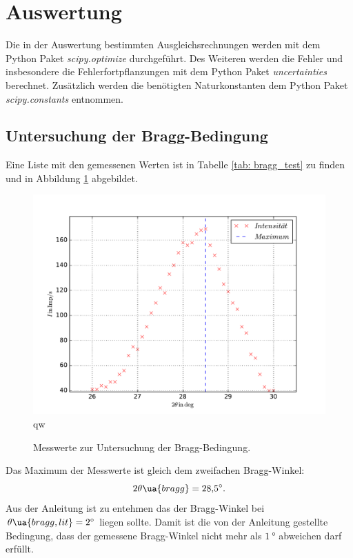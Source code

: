 \section{Auswertung}
Die in der Auswertung bestimmten Ausgleichsrechnungen werden mit
dem Python Paket \emph{scipy.optimize}\cite{scipy} durchgeführt.
Des Weiteren werden die Fehler und insbesondere die Fehlerfortpflanzungen
mit dem Python Paket \emph{uncertainties}\cite{uncertainties} berechnet.
Zusätzlich werden die benötigten Naturkonstanten dem Python Paket \emph{scipy.constants}\cite{scipy}
entnommen.
\FloatBarrier
\subsection{Untersuchung der Bragg-Bedingung}
Eine Liste mit den gemessenen Werten ist in Tabelle \ref{tab: bragg_test} zu finden und in Abbildung \ref{fig: bragg_plot} abgebildet.

\begin{figure}
  \centering
  \includegraphics[width=0.8 \textwidth]{../Messdaten/bragbed.pdf}
qw  \caption{Messwerte zur Untersuchung der Bragg-Bedingung.}
  \label{fig: bragg_plot}
\end{figure}
Das Maximum der Messwerte ist gleich dem zweifachen Bragg-Winkel:
\begin{equation}
  \label{eq:bestimmt_bragg_winkel}
  2\theta\ua{bragg}=\SI{28.5}{\degree}.
\end{equation} %
Aus der Anleitung \cite{anleitung602} ist zu entehmen das der Bragg-Winkel bei $\theta\ua{bragg,lit}=\SI{2}{\degree}$ liegen sollte.
Damit ist die von der Anleitung gestellte Bedingung, dass der gemessene Bragg-Winkel nicht mehr
als $\SI{1}{\degree}$ abweichen darf erfüllt.
\FloatBarrier

